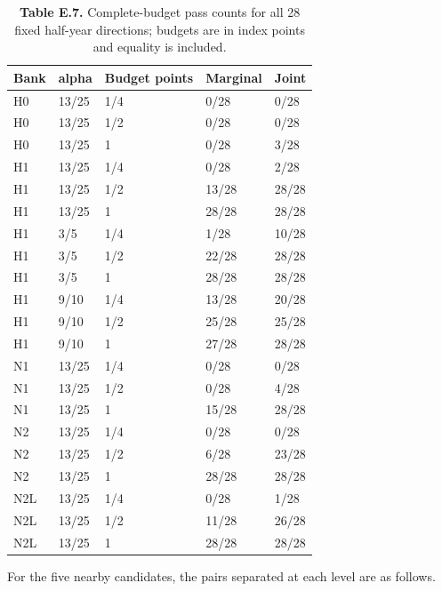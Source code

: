\documentclass[11pt,a4paper]{article}
\begin{document}
\begin{table}[H]
\caption*{\textbf{Table E.7.} Complete-budget pass counts for all 28 fixed half-year directions; budgets are in index points and equality is included.}
\centering\small
\begin{tabular}{@{}lllll@{}}
\toprule
Bank & alpha & Budget points & Marginal & Joint \\
\midrule
H0 & 13/25 & 1/4 & 0/28 & 0/28 \\
H0 & 13/25 & 1/2 & 0/28 & 0/28 \\
H0 & 13/25 & 1 & 0/28 & 3/28 \\
H1 & 13/25 & 1/4 & 0/28 & 2/28 \\
H1 & 13/25 & 1/2 & 13/28 & 28/28 \\
H1 & 13/25 & 1 & 28/28 & 28/28 \\
H1 & 3/5 & 1/4 & 1/28 & 10/28 \\
H1 & 3/5 & 1/2 & 22/28 & 28/28 \\
H1 & 3/5 & 1 & 28/28 & 28/28 \\
H1 & 9/10 & 1/4 & 13/28 & 20/28 \\
H1 & 9/10 & 1/2 & 25/28 & 25/28 \\
H1 & 9/10 & 1 & 27/28 & 28/28 \\
N1 & 13/25 & 1/4 & 0/28 & 0/28 \\
N1 & 13/25 & 1/2 & 0/28 & 4/28 \\
N1 & 13/25 & 1 & 15/28 & 28/28 \\
N2 & 13/25 & 1/4 & 0/28 & 0/28 \\
N2 & 13/25 & 1/2 & 6/28 & 23/28 \\
N2 & 13/25 & 1 & 28/28 & 28/28 \\
N2L & 13/25 & 1/4 & 0/28 & 1/28 \\
N2L & 13/25 & 1/2 & 11/28 & 26/28 \\
N2L & 13/25 & 1 & 28/28 & 28/28 \\
\bottomrule
\end{tabular}
\end{table}

For the five nearby candidates, the pairs separated at each level are as follows.
\end{document}
